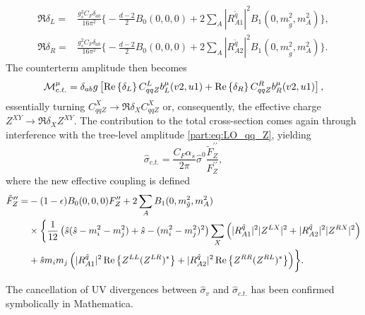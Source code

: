 \documentclass[../main.tex]{subfiles}
\begin{document}
\begin{subequations}
  \begin{align}
    \Re{\delta_L} = & \frac{g_s^2 C_F \delta_{ab}}{16\pi^2} \biggl\{
    -\frac{d-2}{2} B_0(0,0,0) + 2\sum_A|R^{\tilde{q}}_{A1}|^2B_1(0,m_{\tilde{g}}^2,m_A^2)
    \biggr\} ,                                                       \\
    \Re{\delta_R} = & \frac{g_s^2 C_F \delta_{ab}}{16\pi^2} \biggl\{
    -\frac{d-2}{2} B_0(0,0,0) + 2\sum_A|R^{\tilde{q}}_{A2}|^2B_1(0,m_{\tilde{g}}^2,m_A^2)
    \biggr\}.
  \end{align}
\end{subequations}
The counterterm amplitude then becomes
\begin{equation}
  \mathcal{M}_{c.t.}^\mu = \delta_{ab} g\left[\operatorname{Re}\left\{\delta_L\right\} C_{qqZ}^L b_L^\mu(v2,u1) + \operatorname{Re}\left\{\delta_R\right\} C_{qqZ}^R b_R^\mu(v2,u1)\right],
\end{equation}
essentially turning \(C_{qqZ}^X \to \Re{\delta_X} C_{qqZ}^X\) or, consequently, the effective charge \(Z^{XY} \to \Re{\delta_X} Z^{XY}\).
The contribution to the total cross-section comes again through interference with the tree-level amplitude \cref{part:eq:LO_qq_Z}, yielding
\begin{equation}
  \hat\sigma_{c.t.} = \frac{C_F \alpha_s}{2\pi} \hat\sigma^0 \frac{\tilde{F}^{\prime\prime}_Z}{F^{\prime\prime}_Z},
\end{equation}
where the new effective coupling is defined
\begin{align}
  \nonumber
  \tilde{F}^{\prime\prime}_Z = & -(1-\epsilon)B_0(0,0,0) F^{\prime\prime}_Z + 2 \sum_A B_1(0, m_{\tilde{g}}^2, m_A^2)                                                    \\
  \nonumber
                               & \times \biggl\{
  \frac{1}{12} \left(\hat{s}(\hat{s}-m_i^2-m_j^2) + \hat{s} - (m_i^2-m_j^2)^2\right) \sum_{X} \left(|R^{\tilde{q}}_{A1}|^2|Z^{LX}|^2 + |R^{\tilde{q}}_{A2}|^2|Z^{RX}|^2\right) \\
                               & + \hat{s}m_i m_j \left(|R^{\tilde{q}}_{A1}|^2\operatorname{Re}\left\{Z^{LL} (Z^{LR})^\ast\right\} + |R^{\tilde{q}}_{A2}|^2\operatorname{Re}\left\{Z^{RR} (Z^{RL})^\ast\right\}\right)
  \biggr\}.
\end{align}

The cancellation of UV divergences between \(\hat\sigma_v\) and \(\hat\sigma_{c.t.}\) has been confirmed symbolically in Mathematica.
\end{document}
